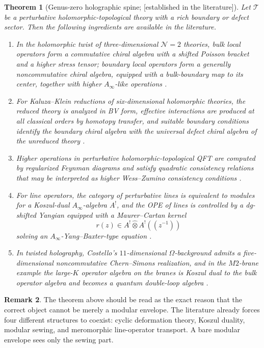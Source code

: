\documentclass[11pt,oneside]{memoir}
\numberwithin{equation}{chapter}
\newtheorem{theorem}{Theorem}[chapter]
\theoremstyle{definition}
\newtheorem{remark}[theorem]{Remark}
\newcommand{\ClaimStatusProvedElsewhere}{\textnormal{[established in the literature]}}
\newcommand{\cT}{\mathcal T}
\newcommand{\hot}{\widehat\otimes}
\newcommand{\Ainf}{A_{\infty}}
\begin{document}
\begin{theorem}[Genus-zero holographic spine; \ClaimStatusProvedElsewhere]
\label{thm:genus-zero-spine}
Let \(\cT\) be a perturbative holomorphic-topological theory with a rich boundary or defect sector.  Then the following ingredients are available in the literature.
\begin{enumerate}[label=\textup{(\arabic*)},leftmargin=2.8em]
\item In the holomorphic twist of three-dimensional \(\mathcal N=2\) theories, bulk local operators form a commutative chiral algebra with a shifted Poisson bracket and a higher stress tensor; boundary local operators form a generally noncommutative chiral algebra, equipped with a bulk-boundary map to its center, together with higher \(\Ainf\)-like operations \cite{CostelloDimofteGaiottoBoundary}.
\item For Kaluza--Klein reductions of six-dimensional holomorphic theories, the reduced theory is analyzed in BV form, effective interactions are produced at all classical orders by homotopy transfer, and suitable boundary conditions identify the boundary chiral algebra with the universal defect chiral algebra of the unreduced theory \cite{ZengTwistedHolography}.
\item Higher operations in perturbative holomorphic-topological QFT are computed by regularized Feynman diagrams and satisfy quadratic consistency relations that may be interpreted as higher Wess--Zumino consistency conditions \cite{GaiottoKulpWuHigher}.
\item For line operators, the category of perturbative lines is equivalent to modules for a Koszul-dual \(\Ainf\)-algebra \(A^!\), and the OPE of lines is controlled by a dg-shifted Yangian equipped with a Maurer--Cartan kernel
\[
  r(z)\in A^!\hot A^!((z^{-1}))
\]
solving an \(\Ainf\)-Yang--Baxter-type equation \cite{DimofteNiuPyLines}.
\item In twisted holography, Costello's \(11\)-dimensional \(\Omega\)-background admits a five-dimensional noncommutative Chern--Simons realization, and in the \(M2\)-brane example the large-\(K\) operator algebra on the branes is Koszul dual to the bulk operator algebra and becomes a quantum double-loop algebra \cite{CostelloOmega,CostelloM2}.
\end{enumerate}
\end{theorem}

\begin{remark}
The theorem above should be read as the exact reason that the correct object cannot be merely a modular envelope.  The literature already forces four different structures to coexist: cyclic deformation theory, Koszul duality, modular sewing, and meromorphic line-operator transport.  A bare modular envelope sees only the sewing part.
\end{remark}
\end{document}
